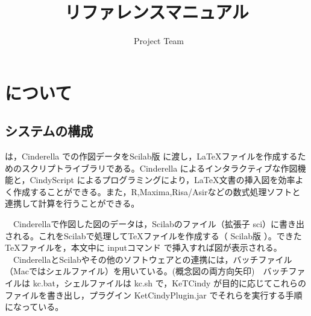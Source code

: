 \documentclass[papersize,a4paper,12pt,uplatex]{jsarticle}
\begin{document}
\title{\ketcindy リファレンスマニュアル}
\author{\ketcindy\ Project Team}
\maketitle


\tableofcontents

\newpage


\section{\ketcindy について}
\subsection{システムの構成}
\ketcindy は，Cinderella での作図データをScilab版 \ketpic に渡し，\LaTeX ファイルを作成するためのスクリプトライブラリである。Cinderella によるインタラクティブな作図機能と，CindyScript によるプログラミングにより，\LaTeX 文書の挿入図を効率よく作成することができる。また，R,Maxima,Risa/Asirなどの数式処理ソフトと連携して計算を行うことができる。



　Cinderellaで作図した図のデータは，Scilabのファイル（拡張子 sci）に書き出される。これをScilabで処理して\TeX ファイルを作成する（ Scilab版 \ketpic）。できた\TeX ファイルを，本文中に inputコマンド で挿入すれば図が表示される。\\
　CinderellaとScilabやその他のソフトウェアとの連携には，バッチファイル（Macではシェルファイル）を用いている。(概念図の両方向矢印)　バッチファイルは kc.bat，シェルファイルは kc.sh で，KeTCindy が目的に応じてこれらのファイルを書き出し，プラグイン KetCindyPlugin.jar でそれらを実行する手順になっている。\\
　\\
\end{document}
